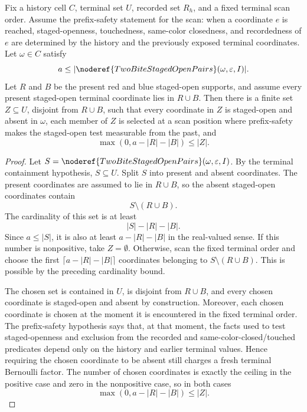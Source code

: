 \begin{helper}
Fix a history cell \(C\), terminal set \(U\), recorded set \(R_h\), and a fixed
terminal scan order.  Assume the prefix-safety statement for the scan: when a
coordinate \(e\) is reached, staged-openness, touchedness, same-color
closedness, and recordedness of \(e\) are determined by the history and the
previously exposed terminal coordinates.  Let \(\omega\in C\) satisfy
\[
a\le |\noderef{TwoBiteStagedOpenPairs}(\omega,\varepsilon,I)|.
\]
Let \(R\) and \(B\) be the present red and blue staged-open supports, and
assume every present staged-open terminal coordinate lies in \(R\cup B\).
Then there is a finite set \(Z\subseteq U\), disjoint from \(R\cup B\), such
that every coordinate in \(Z\) is staged-open and absent in \(\omega\),
each member of \(Z\) is selected at a scan position where prefix-safety makes
the staged-open test measurable from the past, and
\[
\max(0,a-|R|-|B|)\le |Z|.
\]
\end{helper}
\begin{proof}
Let \(S=\noderef{TwoBiteStagedOpenPairs}(\omega,\varepsilon,I)\).  By the
terminal containment hypothesis, \(S\subseteq U\).  Split \(S\) into present
and absent coordinates.  The present coordinates are assumed to lie in
\(R\cup B\), so the absent staged-open coordinates contain
\[
S\setminus (R\cup B).
\]
The cardinality of this set is at least
\[
|S|-|R|-|B|.
\]
Since \(a\le |S|\), it is also at least \(a-|R|-|B|\) in the real-valued
sense.  If this number is nonpositive, take \(Z=\emptyset\).  Otherwise,
scan the fixed terminal order and choose the first
\(\lceil a-|R|-|B|\rceil\) coordinates belonging to
\(S\setminus(R\cup B)\).  This is possible by the preceding cardinality
bound.

The chosen set is contained in \(U\), is disjoint from \(R\cup B\), and every
chosen coordinate is staged-open and absent by construction.  Moreover, each
chosen coordinate is chosen at the moment it is encountered in the fixed
terminal order.  The prefix-safety hypothesis says that, at that moment, the
facts used to test staged-openness and exclusion from the recorded and
same-color-closed/touched predicates depend only on the history and earlier
terminal values.  Hence requiring the chosen coordinate to be absent still
charges a fresh terminal Bernoulli factor.  The number of chosen coordinates
is exactly the ceiling in the positive case and zero in the nonpositive case,
so in both cases
\[
\max(0,a-|R|-|B|)\le |Z|.
\]
\end{proof}
